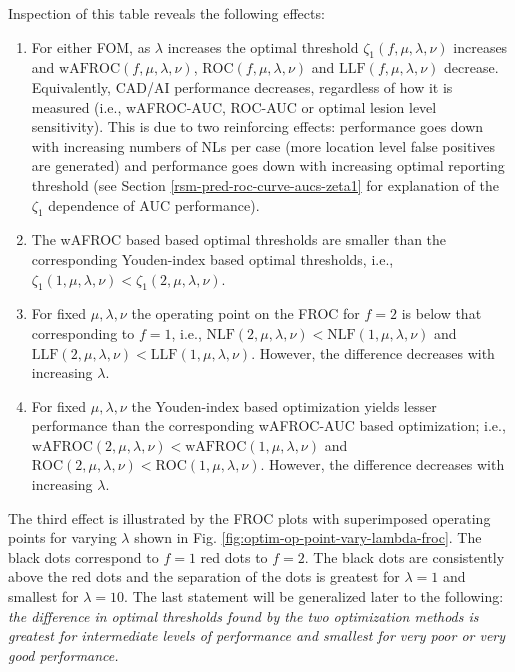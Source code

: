 \documentclass[
]{book}
\begin{document}
Inspection of this table reveals the following effects:

\begin{enumerate}
\def\labelenumi{\arabic{enumi}.}
\item
  For either FOM, as \(\lambda\) increases the optimal threshold \(\zeta_{1} \left ( f, \mu, \lambda, \nu \right )\) increases and \(\text{wAFROC} \left ( f, \mu, \lambda, \nu \right )\), \(\text{ROC} \left ( f, \mu, \lambda, \nu \right )\) and \(\text{LLF} \left ( f, \mu, \lambda, \nu \right )\) decrease. Equivalently, CAD/AI performance decreases, regardless of how it is measured (i.e., wAFROC-AUC, ROC-AUC or optimal lesion level sensitivity). This is due to two reinforcing effects: performance goes down with increasing numbers of NLs per case (more location level false positives are generated) and performance goes down with increasing optimal reporting threshold (see Section \ref{rsm-pred-roc-curve-aucs-zeta1} for explanation of the \(\zeta_1\) dependence of AUC performance).
\item
  The wAFROC based based optimal thresholds are smaller than the corresponding Youden-index based optimal thresholds, i.e., \(\zeta_{1} \left ( 1, \mu, \lambda, \nu \right ) < \zeta_{1} \left ( 2, \mu, \lambda, \nu \right )\).
\item
  For fixed \(\mu, \lambda, \nu\) the operating point on the FROC for \(f = 2\) is below that corresponding to \(f = 1\), i.e., \(\text{NLF} \left (2, \mu, \lambda, \nu \right ) < \text{NLF} \left (1, \mu, \lambda, \nu \right )\) and \(\text{LLF} \left (2, \mu, \lambda, \nu \right ) < \text{LLF} \left (1, \mu, \lambda, \nu \right )\). However, the difference decreases with increasing \(\lambda\).
\item
  For fixed \(\mu, \lambda, \nu\) the Youden-index based optimization yields lesser performance than the corresponding wAFROC-AUC based optimization; i.e., \(\text{wAFROC} \left (2, \mu, \lambda, \nu \right ) < \text{wAFROC} \left (1, \mu, \lambda, \nu \right )\) and \(\text{ROC} \left (2, \mu, \lambda, \nu \right ) < \text{ROC} \left (1, \mu, \lambda, \nu \right )\). However, the difference decreases with increasing \(\lambda\).
\end{enumerate}

The third effect is illustrated by the FROC plots with superimposed operating points for varying \(\lambda\) shown in Fig. \ref{fig:optim-op-point-vary-lambda-froc}. The black dots correspond to \(f = 1\) red dots to \(f = 2\). The black dots are consistently above the red dots and the separation of the dots is greatest for \(\lambda = 1\) and smallest for \(\lambda = 10\). The last statement will be generalized later to the following: \emph{the difference in optimal thresholds found by the two optimization methods is greatest for intermediate levels of performance and smallest for very poor or very good performance.}
\end{document}
